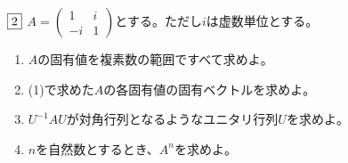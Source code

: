 \documentclass[dvipdfmx]{jsreport}
\newcounter{num}[section]
\begin{document}
\begin{tcolorbox} %
	$\fbox{2}$ $A= \begin{pmatrix}1& i\\ {-i}& 1\end{pmatrix}$とする。ただし$i$は虚数単位とする。
\begin{enumerate}
	\item $A$の固有値を複素数の範囲ですべて求めよ。
	\item (1)で求めた$A$の各固有値の固有ベクトルを求めよ。
	\item $U^{-1}AU$が対角行列となるようなユニタリ行列$U$を求めよ。
	\item $n$を自然数とするとき、$A^n$を求めよ。
\end{enumerate}
\end{tcolorbox}
\end{document}
